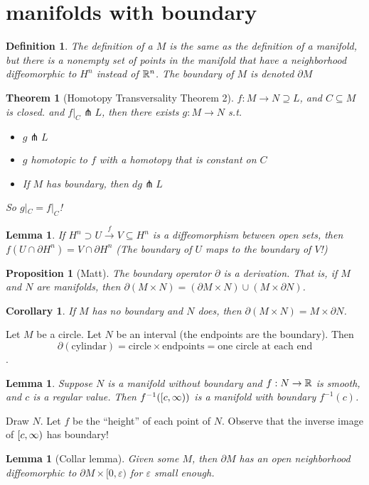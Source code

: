 \documentclass[11pt]{amsbook}
\theoremstyle{mystyle} \newtheorem{thrm}[thm]{Theorem}
\theoremstyle{mystyle} \newtheorem{defi}[thm]{Definition}
\theoremstyle{mystyle} \newtheorem{coro}[thm]{Corollary}
\theoremstyle{mystyle} \newtheorem{propo}[thm]{Proposition}
\theoremstyle{mystyle} \newtheorem{lemm}[thm]{Lemma}
\numberwithin{thm}{section}
\renewcommand{\epsilon}{\varepsilon}
\renewcommand{\d}{\partial}
\newcommand{\transverse}{\pitchfork}
\newcommand{\x}{\times}
\begin{document}
\section{manifolds with boundary}
\begin{defi}
	The definition of a  $M$ is the same as the definition of a manifold, but there is a nonempty set of points in the manifold that have a neighborhood diffeomorphic to $H^n$ instead of ${\mathbb R}^n$.  The boundary of $M$ is denoted $\d M$
\end{defi}

\begin{thrm}[Homotopy Transversality Theorem 2]
	$f: M \to N \supseteq L$, and $C \subseteq M$ is closed.
	and $f|_C \transverse L$, then there exists
	$g: M \to N$ s.t.
	\begin{itemize}
		\item $g \transverse L$
		\item $g$ homotopic to $f$ with a homotopy that is constant on $C$
		\item If $M$ has boundary, then $dg \transverse L$
	\end{itemize}
	So $g|_C = f|_C$!
\end{thrm}
\begin{lemm}
	If $H^n \supset U \overset{f}{\to} V \subseteq H^n$ is a diffeomorphism between open sets, then $f( U \cap \d H^n ) = V \cap \d H^n$
	(The boundary of $U$ maps to the boundary of $V$!)
\end{lemm}
\begin{propo}[Matt]
	The boundary operator $\d$ is a derivation.  That is, if $M$ and $N$ are manifolds, then $\d(M \x N) = (\d M \x N) \cup (M \x \d N)$.
\end{propo}
\begin{coro}
	If $M$ has no boundary and $N$ does, then $\d(M \x N) = M \x \d N$.
\end{coro}
\begin{example}
	Let $M$ be a circle.  Let $N$ be an interval (the endpoints are the boundary).  Then $$\d(\text{cylindar}) = \text{circle} \x \text{endpoints} = \text{one circle at each end}$$.
\end{example}
\begin{lemm}
	Suppose $N$ is a manifold without boundary and $f : N \to {\mathbb R}$ is smooth, and $c$ is a regular value.  Then $f^{-1}([c,\infty))$ is a manifold with boundary $f^{-1}(c)$.
\end{lemm}
\begin{example}
	Draw $N$.  Let $f$ be the ``height'' of each point of $N$.  Observe that the inverse image of $[c, \infty)$ has boundary!
\end{example}
\begin{lemm}[Collar lemma]
	Given some $M$, then $\d M$ has an open neighborhood diffeomorphic to $\d M \x [0, \epsilon)$ for $\epsilon$ small enough.
\end{lemm}
\end{document}
